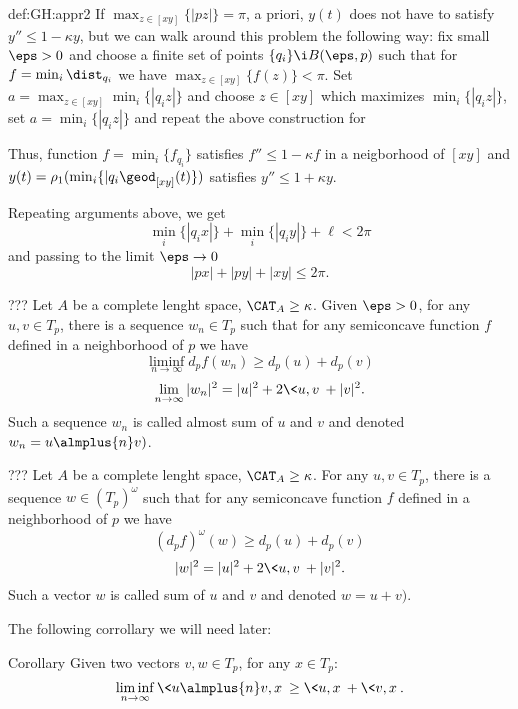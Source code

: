 {\begin{subthm}{def:GH:appr2}
If $\max_{z\in [x y]}\{|pz|\}=\pi$, a priori, $y(t)$ does not have to satisfy $y''\le 1-\kappa y$, but we can walk around this problem the following way: fix small $\eps>0$ and choose a finite set of points $\{q_i\}\i B(\eps,p)$ such that for $f=\min_i\dist_{q_i}$ we have $\max_{z\in [x y]}\{f(z)\}<\pi$.
Set $a=\max_{z\in[x y]}\min_i\{|q_iz|\}$ and choose $z\in [x y]$ which maximizes $\min_i\{|q_iz|\}$, set $a=\min_i\{|q_iz|\}$ and repeat the above construction for 

Thus, function $f=\min_i\{f_{q_i}\}$ satisfies 
$f''\le 1 -\kappa f$ in a neigborhood of $[xy]$ and $y(t)=\rho_1(\min_i\{|q_i\geod_{[xy]}(t)\})$ 
satisfies $y''\le 1+\kappa y$.

Repeating arguments above, we get 
$$\min_i\{|q_ix|\}+\min_i\{|q_iy|\}+\ell< 2\pi$$
and passing to the limit $\eps\to0$
$$|px|+|py|+|xy|\le 2\pi.$$



















\begin{thm}{???}
Let $A$ be a complete lenght space, $\CAT_A\ge\kappa$.
Given $\eps>0$, for any $u,v\in T_p$, there is a sequence $w_n\in T_p$ such that for any semiconcave function $f$ defined in a neighborhood of $p$ we have
$$\liminf_{n\to\infty} d_p f(w_n)\ge d_p(u)+d_p(v)$$
$$\lim_{n\to\infty}|w_n|^2= |u|^2+2\<u,v\> +|v|^2.$$
Such a sequence $w_n$ is called almost sum of $u$ and $v$ and denoted $w_n=u\almplus{n} v)$.
\end{thm}

\begin{thm}{???}
Let $A$ be a complete lenght space, $\CAT_A\ge\kappa$.
For any $u,v\in T_p$, there is a sequence $w\in (T_p)^\omega$ such that for any semiconcave function $f$ defined in a neighborhood of $p$ we have
$$(d_p f)^\omega(w)\ge d_p(u)+d_p(v)$$
$$|w|^2= |u|^2+2\<u,v\> +|v|^2.$$
Such a vector $w$ is called sum of $u$ and $v$ and denoted $w=u+v)$.
\end{thm}








The following corrollary we will need later:

\begin{thm}{Corollary}
Given two vectors $v,w\in T_p$, for any $x\in T_p$:
$$\liminf_{n\to\infty}\<u\almplus{n} v,x\>\ge\<u,x\>+\<v,x\>.$$
\end{thm}


\end{subthm}}
